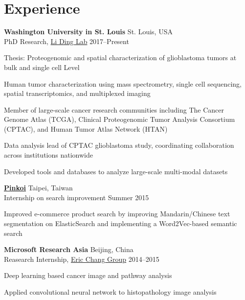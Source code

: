 \section{Experience}

\begin{outerlist}

	\item \textbf{Washington University in St. Louis} \hfill St. Louis, USA\\
	PhD Research, \href{https://dinglab.wustl.edu/}{Li Ding Lab} \hfill
	2017--Present
	\begin{innerlist}
		\item Thesis: Proteogenomic and spatial characterization of glioblastoma tumors at bulk and single cell Level
		\item Human tumor characterization using mass spectrometry, single cell sequencing, spatial transcriptomics, and multiplexed imaging
		\item Member of large-scale cancer research communities including The Cancer Genome Atlas (TCGA), Clinical Proteogenomic Tumor Analysis Consortium (CPTAC), and Human Tumor Atlas Network (HTAN)
		\item Data analysis lead of CPTAC glioblastoma study, coordinating collaboration across institutions nationwide
		\item Developed tools and databases to analyze large-scale multi-modal datasets
	\end{innerlist}

	\item \href{http://pinkoi.com}{\textbf{Pinkoi}} \hfill Taipei, Taiwan\\
	Internship on search improvement \hfill
	Summer 2015
	\begin{innerlist}
		\item Improved e-commerce product search by improving Mandarin/Chinese text segmentation on ElasticSearch and implementing a Word2Vec-based semantic search
	\end{innerlist}

	\item \textbf{Microsoft Research Asia} \hfill Beijing, China\\
	Reasearch Internship, \href{https://www.microsoft.com/en-us/research/people/echang/}{Eric Chang Group} \hfill
	2014--2015
	\begin{innerlist}
		\item Deep learning based cancer image and pathway analysis
		\item Applied convolutional neural network to histopathology image analysis
	\end{innerlist}


\end{outerlist}
